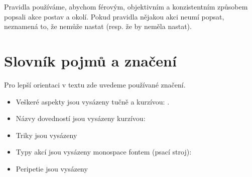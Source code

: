 \documentclass[../main.tex]{subfiles}
\begin{document}
Pravidla používáme, abychom férovým, objektivním a konzistentním způsobem popsali akce postav a okolí. Pokud pravidla nějakou akci neumí popsat, neznamená to, že nemůže nastat (resp. že by neměla nastat).

\section{Slovník pojmů a značení}
\label{sec:slovnik}
Pro lepší orientaci v textu zde uvedeme používané značení.

\begin{itemize}
\item Veškeré aspekty jsou vysázeny tučně a kurzívou: .
\item Názvy dovedností jsou vysázeny kurzívou: 
\item Triky jsou vysázeny 
\item Typy akcí jsou vysázeny monospace fontem (psací stroj): 
\item Peripetie jsou vysázeny 
\end{itemize}
\end{document}
